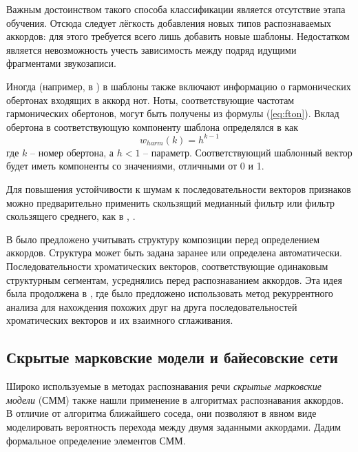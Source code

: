 Важным достоинством такого способа классификации является отсутствие этапа
обучения. Отсюда следует лёгкость добавления новых типов распознаваемых
аккордов: для этого требуется всего лишь добавить новые шаблоны. Недостатком
является невозможность учесть зависимость между подряд идущими фрагментами
звукозаписи.

Иногда (например, в \cite{Oudre2009}) в шаблоны также включают информацию о
гармонических обертонах входящих в аккорд нот. Ноты, соответствующие частотам
гармонических обертонов, могут быть получены из формулы (\ref{eq:fton}). Вклад
обертона в соответствующую компоненту шаблона определялся в \cite{Gomez2006} как
\begin{equation} \label{eq:templates_harmonics}
w_{harm}(k) = h^{k-1}
\end{equation}
где $k$ -- номер обертона, а $h < 1$ -- параметр. Соответствующий шаблонный
вектор будет иметь компоненты со значениями, отличными от 0 и 1.

Для повышения устойчивости к шумам к последовательности векторов признаков
можно предварительно применить скользящий медианный фильтр или фильтр
скользящего среднего, как в \cite{Lee2006}, \cite{Oudre2009}. 

В \cite{Mauch2009} было предложено учитывать структуру композиции перед
определением аккордов. Структура может быть задана заранее или определена
автоматически. Последовательности хроматических векторов, соответствующие
одинаковым структурным сегментам, усреднялись перед распознаванием аккордов. Эта
идея была продолжена в \cite{Cho2011}, где было предложено использовать метод
рекуррентного анализа для нахождения похожих друг на друга последовательностей
хроматических векторов и их взаимного сглаживания.

\subsection{Скрытые марковские модели и байесовские сети}

Широко используемые в методах распознавания речи \emph{скрытые марковские
модели} (СММ) \cite{Rabiner1989} также нашли применение в алгоритмах
распознавания аккордов. В отличие от алгоритма ближайшего соседа, они позволяют
в явном виде моделировать вероятность перехода между двумя заданными аккордами.
Дадим формальное определение элементов СММ.

